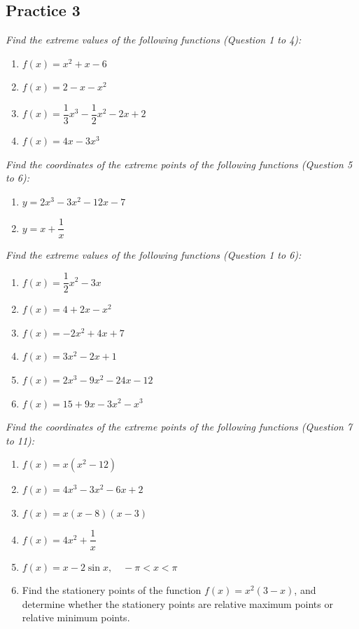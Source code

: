 \documentclass{report}
\begin{document}
\subsection{Practice 3}

\noindent \hspace{1.2em}\textit{
    Find the extreme values of the following functions (Question 1 to 4):
}

\begin{enumerate}
    \item $f(x)=x^2+x-6$
    \item $f(x)=2-x-x^2$
    \item $f(x)=\dfrac{1}{3} x^3-\dfrac{1}{2} x^2-2x+2$
    \item $f(x)=4 x-3 x^3$
\end{enumerate}

\noindent \hspace{1.2em}\textit{Find the coordinates of the extreme points of the following functions (Question 5 to 6):}
\begin{enumerate}[resume]
    \item $y=2 x^3-3 x^2-12 x-7$
    \item $y=x+\dfrac{1}{x}$
\end{enumerate}

\noindent \hspace{1.2em}\textit{Find the extreme values of the following functions (Question 1 to 6):}
\begin{enumerate}
    \item $f(x)=\dfrac{1}{2} x^2-3 x$
    \item $f(x)=4+2 x-x^2$
    \item $f(x)=-2 x^2+4 x+7$
    \item $f(x)=3 x^2-2 x+1$
    \item $f(x)=2 x^3-9 x^2-24 x-12$
    \item $f(x)=15+9 x-3 x^2-x^3$
\end{enumerate}

\noindent \hspace{1.2em}\textit{Find the coordinates of the extreme points of the following functions (Question 7 to 11):}
\begin{enumerate}[resume]
    \item $f(x)=x\left(x^2-12\right)$
    \item $f(x)=4 x^3-3 x^2-6 x+2$
    \item $f(x)=x(x-8)(x-3)$
    \item $f(x)=4 x^2+\dfrac{1}{x}$
    \item $f(x)=x-2 \sin x, \quad-\pi<x<\pi$
    \item Find the stationery points of the function $f(x)=x^2(3-x)$, and determine
          whether the stationery points are relative maximum points or relative minimum
          points.
\end{enumerate}
\end{document}
